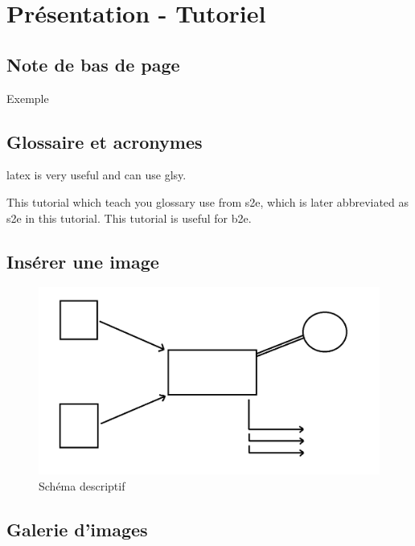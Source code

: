 \chapter{Présentation - Tutoriel}



\section{Note de bas de page}

Exemple\footnotemark\\

\section{Glossaire et acronymes}

\gls{latex} is very useful and can use \gls{glsy}.

This tutorial which teach you glossary use from \acrlong{s2e}, which is  later abbreviated as \acrshort{s2e}  in this tutorial. This tutorial is useful for \acrlong{b2e}.


\section{Insérer une image}

\begin{figure}[!ht]
\begin{center}
\includegraphics[width=15cm]{presentation/schema}
\end{center}
\caption{Schéma descriptif}
\end{figure}

\section{Galerie d'images}

